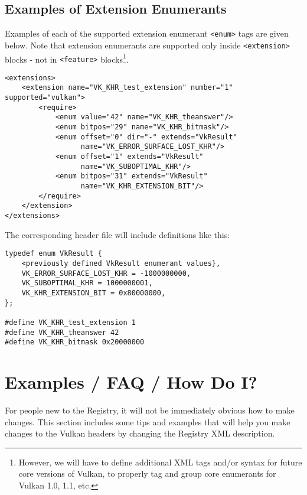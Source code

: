 \documentclass{article}
\def\tag#1{{\tt <#1>\index{<#1>}}}
\begin{document}
\subsection{Examples of Extension Enumerants}
\label{tag:required:examples}

Examples of each of the supported extension enumerant \tag{enum} tags are
given below. Note that extension enumerants are supported only inside
\tag{extension} blocks - not in \tag{feature} blocks\footnote{
    However, we will have to define additional XML tags and/or syntax for
    future core versions of Vulkan, to properly tag and group core
    enumerants for Vulkan 1.0, 1.1, etc.}.

\begin{verbatim}
<extensions>
    <extension name="VK_KHR_test_extension" number="1" supported="vulkan">
        <require>
            <enum value="42" name="VK_KHR_theanswer"/>
            <enum bitpos="29" name="VK_KHR_bitmask"/>
            <enum offset="0" dir="-" extends="VkResult"
                  name="VK_ERROR_SURFACE_LOST_KHR"/>
            <enum offset="1" extends="VkResult"
                  name="VK_SUBOPTIMAL_KHR"/>
            <enum bitpos="31" extends="VkResult"
                  name="VK_KHR_EXTENSION_BIT"/>
        </require>
    </extension>
</extensions>
\end{verbatim}

The corresponding header file will include definitions like this:

\begin{verbatim}
typedef enum VkResult {
    <previously defined VkResult enumerant values},
    VK_ERROR_SURFACE_LOST_KHR = -1000000000,
    VK_SUBOPTIMAL_KHR = 1000000001,
    VK_KHR_EXTENSION_BIT = 0x80000000,
};

#define VK_KHR_test_extension 1
#define VK_KHR_theanswer 42
#define VK_KHR_bitmask 0x20000000
\end{verbatim}

\clearpage
\appendix

\section{Examples / FAQ / How Do I?}
\label{examples}

For people new to the Registry, it will not be immediately obvious how to make
changes. This section includes some tips and examples that will help you
make changes to the Vulkan headers by changing the Registry XML description.
\end{document}
